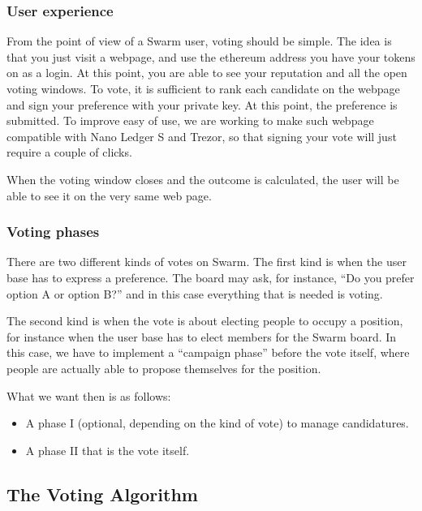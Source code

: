 \documentclass[submission, copyright,creativecommons,sharealike,noncommercial]{eptcs}
\begin{document}
\subsubsection{User experience}\label{subsubsec:User experience}
%
	From the point of view of a Swarm user, voting should be simple. The idea is that you just visit a webpage, and use the ethereum address you have your tokens on as a login. At this point, you are able to see your reputation and all the open voting windows. To vote, it is sufficient to rank each candidate on the webpage and sign your preference with your private key. At this point, the preference is submitted. To improve easy of use, we are working to make such webpage compatible with Nano Ledger S and Trezor, so that signing your vote will just require a couple of clicks.
	
	When the voting window closes and the outcome is calculated, the user will be able to see it on the very same web page.
%
%
\subsubsection{Voting phases}\label{subsubsec:Voting phases}
%
	There are two different kinds of votes on Swarm. The first kind is when the user base has to express a preference. The board may ask, for instance, ``Do you prefer option A or option B?'' and in this case everything that is needed is voting. 
	
	The second kind is when the vote is about electing people to occupy a position, for instance when the user base has to elect members for the Swarm board. In this case, we have to implement a ``campaign phase'' before the vote itself, where people are actually able to propose themselves for the position.
	
	What we want then is as follows:
	\begin{itemize}
		\item A phase I (optional, depending on the kind of vote) to manage candidatures.
		\item A phase II that is the vote itself.
	\end{itemize}
%
%
\subsection{The Voting Algorithm}\label{subsec:Intuitive algorithm explanation}
%
\end{document}
